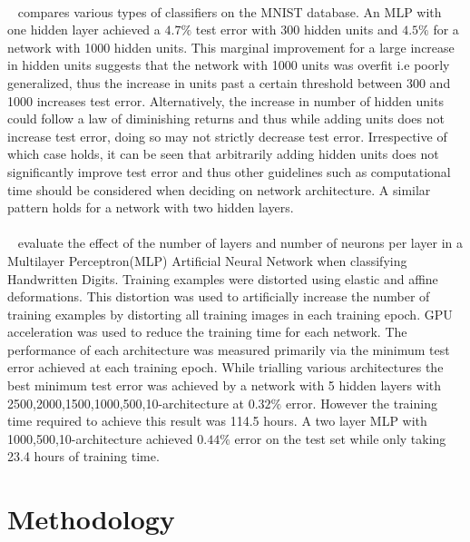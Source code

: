 \documentclass{article}
\begin{document}
 \paragraph{} ~\citet{lecun1998gradient} compares various types of classifiers on the MNIST database. An MLP with one hidden layer achieved a $4.7\%$ test error with 300 hidden units and $4.5\%$ for a network with 1000 hidden units. This marginal improvement for a large increase in hidden units suggests that the network with 1000 units was overfit i.e poorly generalized, thus the increase in units past a certain threshold between 300 and 1000 increases test error. Alternatively, the increase in number of hidden units could follow a law of diminishing returns and thus while adding units does not increase test error, doing so may not strictly decrease test error. Irrespective of which case holds, it can be seen that arbitrarily adding hidden units does not significantly improve test error and thus other guidelines such as computational time should be considered when deciding on network architecture. A similar pattern holds for a network with two hidden layers.
 
 \paragraph{}~\citet{deepsimpleMLP} evaluate the effect of the number of layers and number of neurons per layer in a Multilayer Perceptron(MLP) Artificial Neural Network when classifying Handwritten Digits. Training examples were distorted using elastic and affine deformations. This distortion was used to artificially increase the number of training examples by distorting all training images in each training epoch. GPU acceleration was used to reduce the training time for each network. The performance of each architecture was measured primarily via the minimum test error achieved at each training epoch. While trialling various architectures the best minimum test error was achieved by a network with 5 hidden layers with 2500,2000,1500,1000,500,10-architecture at $0.32\%$ error. However the training time required to achieve this result was 114.5 hours. A two layer MLP with 1000,500,10-architecture achieved $0.44\%$ error on the test set while only taking 23.4 hours of training time. 
 
 
 

  
\section{Methodology}
\end{document}

